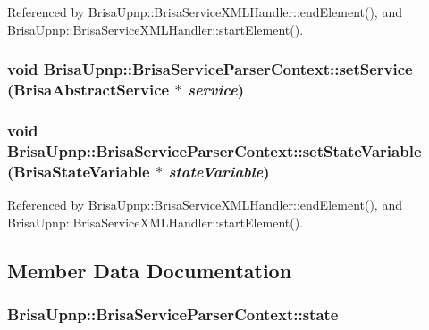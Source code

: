 Referenced by BrisaUpnp::BrisaServiceXMLHandler::endElement(), and BrisaUpnp::BrisaServiceXMLHandler::startElement().\hypertarget{classBrisaUpnp_1_1BrisaServiceParserContext_a1927ada7f7ac5b929791e7c6cb9093ee}{
\subsubsection[{setService}]{\setlength{\rightskip}{0pt plus 5cm}void BrisaUpnp::BrisaServiceParserContext::setService ({\bf BrisaAbstractService} $\ast$ {\em service})}}
\label{classBrisaUpnp_1_1BrisaServiceParserContext_a1927ada7f7ac5b929791e7c6cb9093ee}
\hypertarget{classBrisaUpnp_1_1BrisaServiceParserContext_a06e08c8c57ac4bce5762e9b464f925e9}{
\subsubsection[{setStateVariable}]{\setlength{\rightskip}{0pt plus 5cm}void BrisaUpnp::BrisaServiceParserContext::setStateVariable ({\bf BrisaStateVariable} $\ast$ {\em stateVariable})}}
\label{classBrisaUpnp_1_1BrisaServiceParserContext_a06e08c8c57ac4bce5762e9b464f925e9}


Referenced by BrisaUpnp::BrisaServiceXMLHandler::endElement(), and BrisaUpnp::BrisaServiceXMLHandler::startElement().

\subsection{Member Data Documentation}
\hypertarget{classBrisaUpnp_1_1BrisaServiceParserContext_a0268f1aa5844e3e06ecbc7ab45903647}{
\subsubsection[{state}]{ {\bf BrisaUpnp::BrisaServiceParserContext::state}}}
\label{classBrisaUpnp_1_1BrisaServiceParserContext_a0268f1aa5844e3e06ecbc7ab45903647}


